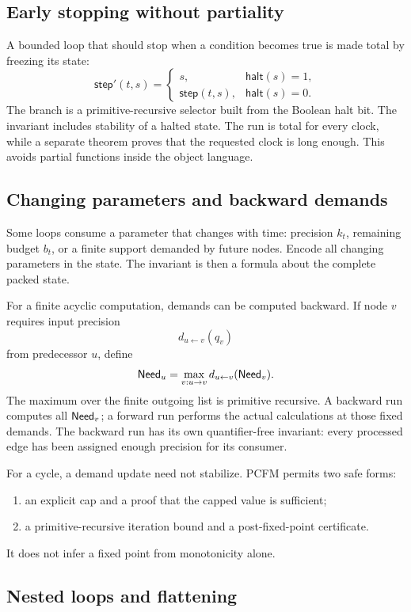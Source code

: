 \subsection{Early stopping without partiality}

A bounded loop that should stop when a condition becomes true is made total by
freezing its state:
\[
 \mathsf{step}'(t,s)=
 \begin{cases}
   s,&\mathsf{halt}(s)=1,\\
   \mathsf{step}(t,s),&\mathsf{halt}(s)=0.
 \end{cases}
\]
The branch is a primitive-recursive selector built from the Boolean halt bit.
The invariant includes stability of a halted state.  The run is total for
every clock, while a separate theorem proves that the requested clock is long
enough.  This avoids partial functions inside the object language.

\subsection{Changing parameters and backward demands}

Some loops consume a parameter that changes with time: precision \(k_t\),
remaining budget \(b_t\), or a finite support demanded by future nodes.  Encode
all changing parameters in the state.  The invariant is then a formula about
the complete packed state.

For a finite acyclic computation, demands can be computed backward.  If node
\(v\) requires input precision
\[
  d_{u\leftarrow v}(q_v)
\]
from predecessor \(u\), define
\[
  \mathsf{Need}_u=\max_{v:u\to v} d_{u\leftarrow v}(\mathsf{Need}_v).
\]
The maximum over the finite outgoing list is primitive recursive.  A backward
run computes all \(\mathsf{Need}_v\); a forward run performs the actual calculations
at those fixed demands.  The backward run has its own quantifier-free
invariant:
every processed edge has been assigned enough precision for its consumer.

For a cycle, a demand update need not stabilize.  PCFM permits two safe forms:
\begin{enumerate}
\item an explicit cap and a proof that the capped value is sufficient;
\item a primitive-recursive iteration bound and a post-fixed-point
certificate.
\end{enumerate}
It does not infer a fixed point from monotonicity alone.

\subsection{Nested loops and flattening}


